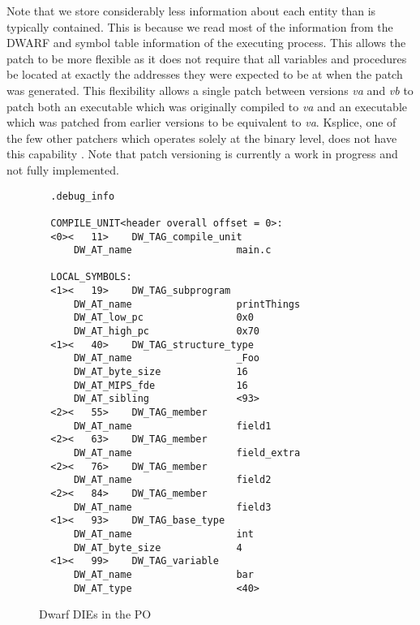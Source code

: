 \documentclass[a4paper,12pt]{article}
\begin{document}
Note that we store considerably less information about each entity
than is typically contained. This is because we read most of the
information from the DWARF and symbol table information of the
executing process. This allows the patch to be more flexible as it
does not require that all variables and procedures be located at
exactly the addresses they were expected to be at when the patch was
generated. This flexibility allows a single patch between versions \emph{va}
and \emph{vb} to patch both an executable which was originally compiled to \emph{va}
and an executable which was patched from earlier versions to be
equivalent to \emph{va}. Ksplice, one of the few other patchers which
operates solely at the binary level, does not have this capability \cite{ksplice}. Note
that patch versioning is currently a work in progress and not fully
implemented.
\begin{wrapfigure}{r}{0.5\linewidth}
{\footnotesize
\begin{verbatim}
  .debug_info

  COMPILE_UNIT<header overall offset = 0>:
  <0><   11>	DW_TAG_compile_unit
      DW_AT_name                  main.c

  LOCAL_SYMBOLS:
  <1><   19>	DW_TAG_subprogram
      DW_AT_name                  printThings
      DW_AT_low_pc                0x0
      DW_AT_high_pc               0x70
  <1><   40>	DW_TAG_structure_type
      DW_AT_name                  _Foo
      DW_AT_byte_size             16
      DW_AT_MIPS_fde              16
      DW_AT_sibling               <93>
  <2><   55>	DW_TAG_member
      DW_AT_name                  field1
  <2><   63>	DW_TAG_member
      DW_AT_name                  field_extra
  <2><   76>	DW_TAG_member
      DW_AT_name                  field2
  <2><   84>	DW_TAG_member
      DW_AT_name                  field3
  <1><   93>	DW_TAG_base_type
      DW_AT_name                  int
      DW_AT_byte_size             4
  <1><   99>	DW_TAG_variable
      DW_AT_name                  bar
      DW_AT_type                  <40>
\end{verbatim}
}
\caption{Dwarf DIEs in the PO}
\label{fig:dies}
\vspace{-10pt}
\end{wrapfigure}
\end{document}
